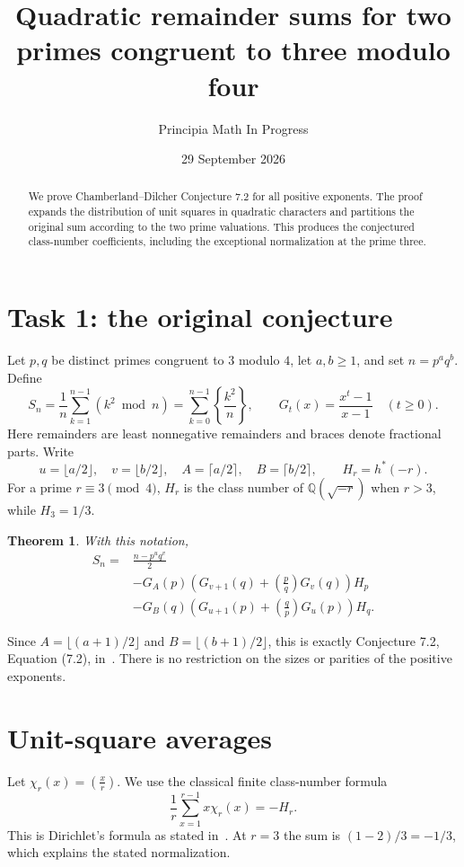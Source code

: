 \documentclass[11pt]{article}
\title{Quadratic remainder sums for two primes congruent to three modulo four}
\author{Principia Math In Progress}
\date{29 September 2026}
\newtheorem{theorem}{Theorem}
\newcommand{\leg}[2]{\left(\frac{#1}{#2}\right)}
\newcommand{\fr}[1]{\left\{#1\right\}}
\begin{document}
\maketitle
\begin{abstract}
We prove Chamberland--Dilcher Conjecture 7.2 for all positive exponents.
The proof expands the distribution of unit squares in quadratic characters
and partitions the original sum according to the two prime valuations.
This produces the conjectured class-number coefficients, including the
exceptional normalization at the prime three.
\end{abstract}

\section*{Task 1: the original conjecture}
Let $p,q$ be distinct primes congruent to $3$ modulo $4$, let $a,b\ge1$,
and set $n=p^a q^b$. Define
\[
 S_n=\frac1n\sum_{k=1}^{n-1}(k^2\bmod n)
     =\sum_{k=0}^{n-1}\fr{\frac{k^2}{n}},
 \qquad G_t(x)=\frac{x^t-1}{x-1}\quad(t\ge0).
\]
Here remainders are least nonnegative remainders and braces denote
fractional parts. Write
\[
 u=\lfloor a/2\rfloor,\quad v=\lfloor b/2\rfloor,\quad
 A=\lceil a/2\rceil,\quad B=\lceil b/2\rceil,
 \qquad H_r=h^*(-r).
\]
For a prime $r\equiv3\pmod4$, $H_r$ is the class number of
$\mathbb Q(\sqrt{-r})$ when $r>3$, while $H_3=1/3$.

\begin{theorem}\label{thm:main}
With this notation,
\begin{align*}
 S_n={}&\frac{n-p^u q^v}{2}\\
 &-G_A(p)\left(G_{v+1}(q)+\leg pq G_v(q)\right)H_p\\
 &-G_B(q)\left(G_{u+1}(p)+\leg qp G_u(p)\right)H_q.
\end{align*}
\end{theorem}
Since $A=\lfloor(a+1)/2\rfloor$ and $B=\lfloor(b+1)/2\rfloor$,
this is exactly Conjecture 7.2, Equation (7.2), in~\cite[p.~21]{CD}.
There is no restriction on the sizes or parities of the positive exponents.

\section*{Unit-square averages}
Let $\chi_r(x)=\leg xr$. We use the classical finite class-number formula
\begin{equation}\label{eq:class}
 \frac1r\sum_{x=1}^{r-1}x\chi_r(x)=-H_r.
\end{equation}
This is Dirichlet's formula as stated in~\cite[Theorem 4.1 and
Corollary 4.3]{CD}. At $r=3$ the sum is $(1-2)/3=-1/3$, which
explains the stated normalization.
\end{document}
